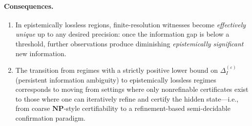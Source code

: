 \documentclass[12pt]{article}
\theoremstyle{definition}
\theoremstyle{plain}
\begin{document}
\paragraph{Consequences.}
\begin{enumerate}
  \item In epistemically lossless regions, finite-resolution witnesses become \emph{effectively unique} up to any desired precision: once the information gap is below a threshold, further observations produce diminishing \emph{epistemically significant} new information.  
  \item The transition from regimes with a strictly positive lower bound on \(\Delta_I^{(\varepsilon)}\) (persistent information ambiguity) to epistemically lossless regimes corresponds to moving from settings where only nonrefinable certificates exist to those where one can iteratively refine and certify the hidden state—i.e., from coarse \(\mathbf{NP}\)-style certifiability to a refinement-based semi-decidable confirmation paradigm.
\end{enumerate}
\end{document}
